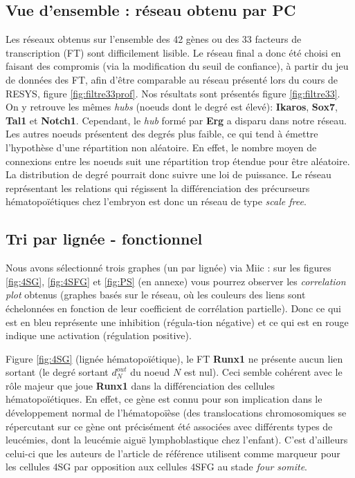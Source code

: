 \documentclass[fleqn,11pt]{SelfArx} %
\begin{document}
\subsection{Vue d'ensemble : réseau obtenu par PC}
Les réseaux obtenus sur l'ensemble des 42 gènes ou des 33 facteurs de transcription (FT) sont difficilement lisible. Le réseau final a donc été choisi en faisant des compromis (via la modification du seuil de confiance), à partir du jeu de données des FT, afin d'être comparable au réseau présenté lors du cours de RESYS, figure \ref{fig:filtre33prof}. Nos résultats sont présentés figure \ref{fig:filtre33}. On y retrouve les mêmes \textit{hubs} (noeuds dont le degré est élevé): \textbf{Ikaros}, \textbf{Sox7}, \textbf{Tal1} et \textbf{Notch1}. Cependant, le \textit{hub} formé par \textbf{Erg} a disparu dans notre réseau. Les autres noeuds présentent des degrés plus faible, ce qui tend à émettre l'hypothèse d'une répartition non aléatoire. En effet, le nombre moyen de connexions entre les noeuds suit une répartition trop étendue pour être aléatoire. La distribution de degré pourrait donc suivre une loi de puissance. Le réseau représentant les relations qui régissent la différenciation des précurseurs hématopoïétiques chez l'embryon est donc un réseau de type \textit{scale free}\href{http://eaton.math.rpi.edu/CSUMS/Papers/ScaleFree/Scale-Free\%20Networks.pdf}{\cite{Scale}}.


\subsection{Tri par lignée - fonctionnel}

Nous avons sélectionné trois graphes (un par lignée) via Miic : sur les figures \ref{fig:4SG}, \ref{fig:4SFG} et \ref{fig:PS} (en annexe) vous pourrez observer les \textit{correlation plot} obtenus (graphes basés sur le réseau, où les couleurs des liens sont échelonnées en fonction de leur coefficient de corrélation partielle). Donc ce qui est en bleu représente une inhibition (régula-tion négative) et ce qui est en rouge indique une activation (régulation positive). 

 
\par Figure \ref{fig:4SG} (lignée hématopoïétique), le FT \textbf{Runx1} ne présente aucun lien sortant (le degré sortant $d_N^{out}$ du noeud $N$ est nul). Ceci semble cohérent avec le rôle majeur que joue \textbf{Runx1} dans la différenciation des cellules hématopoïétiques. En effet, ce gène est connu pour son implication dans le développement normal de l'hématopoïèse (des translocations chromosomiques se répercutant sur ce gène ont précisément été associées avec différents types de leucémies, dont la leucémie aiguë lymphoblastique chez l'enfant\href{https://www.ncbi.nlm.nih.gov/pubmed/21869842}{\cite{Runx1}}). C'est d'ailleurs celui-ci que les auteurs de l'article de référence utilisent comme marqueur pour les cellules 4SG par opposition aux cellules 4SFG au stade \textit{four somite}.
\end{document}
